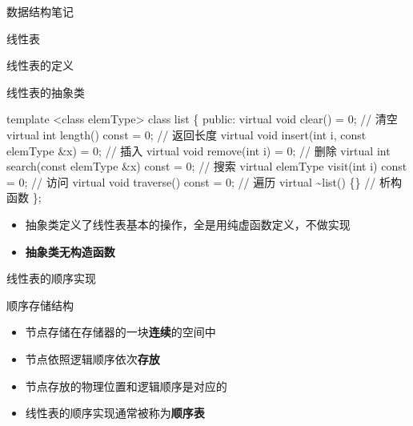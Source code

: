 \documentclass[
  ignorenonframetext,
]{beamer}
\newenvironment{Shaded}{}{}
\newcommand{\NormalTok}[1]{#1}
\providecommand{\tightlist}{%
  \setlength{\itemsep}{0pt}\setlength{\parskip}{0pt}}
\begin{document}
\begin{frame}[fragile]{数据结构笔记}
\begin{block}{线性表}
\begin{block}{线性表的定义}
\begin{block}{线性表的抽象类}
\protect{}\label{ux7ebfux6027ux8868ux7684ux62bdux8c61ux7c7b}
\begin{Shaded}
\begin{Highlighting}[]
\NormalTok{template \textless{}class elemType\textgreater{}}
\NormalTok{class list}
\NormalTok{\{}
\NormalTok{  public:}
\NormalTok{    virtual void clear() = 0;                           // 清空}
\NormalTok{    virtual int length() const = 0;                     // 返回长度}
\NormalTok{    virtual void insert(int i, const elemType \&x) = 0;  // 插入}
\NormalTok{    virtual void remove(int i) = 0;                     // 删除}
\NormalTok{    virtual int search(const elemType \&x) const = 0;    // 搜索}
\NormalTok{    virtual elemType visit(int i) const = 0;            // 访问}
\NormalTok{    virtual void traverse() const = 0;                  // 遍历}
\NormalTok{    virtual \textasciitilde{}list() \{\}                                  // 析构函数}
\NormalTok{\};}
\end{Highlighting}
\end{Shaded}

\begin{itemize}
\tightlist
\item
  抽象类定义了线性表基本的操作，全是用纯虚函数定义，不做实现
\item
  \textbf{抽象类无构造函数}
\end{itemize}
\end{block}
\end{block}

\begin{block}{线性表的顺序实现}
\protect{}\label{ux7ebfux6027ux8868ux7684ux987aux5e8fux5b9eux73b0}
\begin{block}{顺序存储结构}
\protect{}\label{ux987aux5e8fux5b58ux50a8ux7ed3ux6784}
\begin{itemize}
\tightlist
\item
  节点存储在存储器的一块\textbf{连续}的空间中
\item
  节点依照逻辑顺序依次\textbf{存放}
\item
  节点存放的物理位置和逻辑顺序是对应的
\item
  线性表的顺序实现通常被称为\textbf{顺序表}
\end{itemize}
\end{block}


\end{block}
\end{block}
\end{frame}
\end{document}
